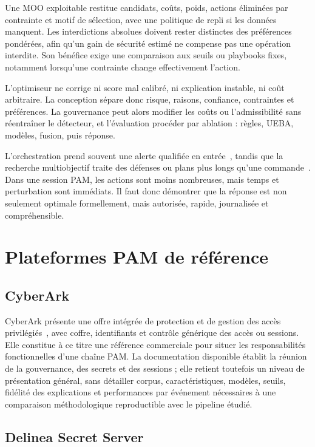 \documentclass[11pt,a4paper,oneside]{report}
\theoremstyle{definition}
\theoremstyle{plain}
\begin{document}
Une MOO exploitable restitue candidats, coûts, poids, actions éliminées par contrainte et motif de sélection, avec une politique de repli si les données manquent. Les interdictions absolues doivent rester distinctes des préférences pondérées, afin qu'un gain de sécurité estimé ne compense pas une opération interdite. Son bénéfice exige une comparaison aux seuils ou playbooks fixes, notamment lorsqu'une contrainte change effectivement l'action.

L'optimiseur ne corrige ni score mal calibré, ni explication instable, ni coût arbitraire. La conception sépare donc risque, raisons, confiance, contraintes et préférences. La gouvernance peut alors modifier les coûts ou l'admissibilité sans réentraîner le détecteur, et l'évaluation procéder par ablation : règles, UEBA, modèles, fusion, puis réponse.

L'orchestration prend souvent une alerte qualifiée en entrée~\cite{ref15,ref41}, tandis que la recherche multiobjectif traite des défenses ou plans plus longs qu'une commande~\cite{ref33,ref38}. Dans une session PAM, les actions sont moins nombreuses, mais temps et perturbation sont immédiats. Il faut donc démontrer que la réponse est non seulement optimale formellement, mais autorisée, rapide, journalisée et compréhensible.

\section{Plateformes PAM de référence}
\label{sec:domain-products}

\subsection{CyberArk}

CyberArk présente une offre intégrée de protection et de gestion des accès privilégiés~\cite{ref16}, avec coffre, identifiants et contrôle générique des accès ou sessions. Elle constitue à ce titre une référence commerciale pour situer les responsabilités fonctionnelles d'une chaîne PAM. La documentation disponible établit la réunion de la gouvernance, des secrets et des sessions ; elle retient toutefois un niveau de présentation général, sans détailler corpus, caractéristiques, modèles, seuils, fidélité des explications et performances par événement nécessaires à une comparaison méthodologique reproductible avec le pipeline étudié.

\subsection{Delinea Secret Server}
\end{document}
